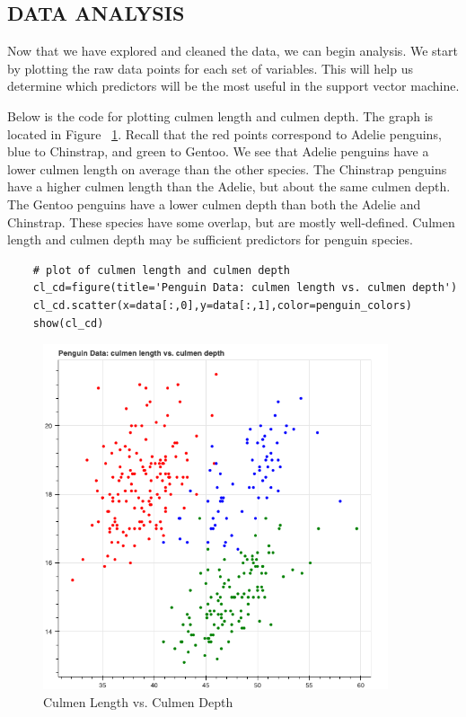 \documentclass[12pt]{article}
\begin{document}
\subsection{DATA ANALYSIS}

Now that we have explored and cleaned the data, we can begin analysis. We start by plotting the raw data points for each set of variables. This will help us determine which predictors will be the most useful in the support vector machine.

Below is the code for plotting culmen length and culmen depth. The graph is located in Figure ~\ref{fig_cl_cd}. Recall that the red points correspond to Adelie penguins, blue to Chinstrap, and green to Gentoo. We see that Adelie penguins have a lower culmen length on average than the other species. The Chinstrap penguins have a higher culmen length than the Adelie, but about the same culmen depth. The Gentoo penguins have a lower culmen depth than both the Adelie and Chinstrap. These species have some overlap, but are mostly well-defined. Culmen length and culmen depth may be sufficient predictors for penguin species.

\begin{verbatim}
    # plot of culmen length and culmen depth
    cl_cd=figure(title='Penguin Data: culmen length vs. culmen depth')
    cl_cd.scatter(x=data[:,0],y=data[:,1],color=penguin_colors)
    show(cl_cd)
\end{verbatim}

\begin{figure}[H]
    \centering
    \includegraphics[width=4in]{Figures/penguins/cl_cd.png}
    \caption{Culmen Length vs. Culmen Depth}
    \label{fig_cl_cd}
\end{figure}
\end{document}
